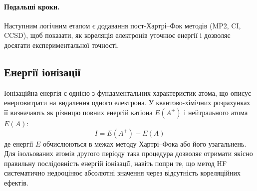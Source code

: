 \paragraph{Подальші кроки.}
Наступним логічним етапом є додавання пост-Хартрі–Фок методів (MP2, CI, CCSD), щоб показати, як кореляція електронів уточнює енергії і дозволяє досягати експериментальної точності.


\subsection{Енергії іонізації}

Іонізаційна енергія є однією з фундаментальних характеристик атома, що описує енерговитрати на видалення одного електрона.
У квантово-хімічних розрахунках її визначають як різницю повних енергій катіона \(E(A^+)\) і нейтрального атома \(E(A)\):
\[
    I = E(A^+) - E(A)
\]
де енергії \(E\) обчислюються в межах методу Хартрі–Фока або його узагальнень.
Для ізольованих атомів другого періоду така процедура дозволяє отримати якісно правильну послідовність енергій іонізації, навіть попри те, що метод HF систематично недооцінює абсолютні значення через відсутність кореляційних ефектів.


